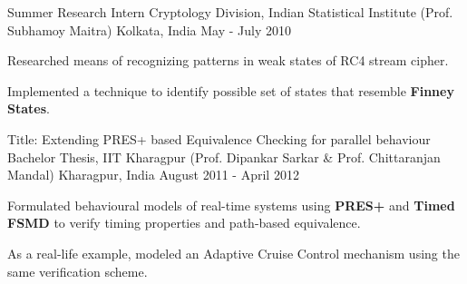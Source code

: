 

\begin{cventries}
    
  \cventry
    {Summer Research Intern} %
    {Cryptology Division, Indian Statistical Institute (Prof. Subhamoy Maitra)} %
    {Kolkata, India} %
    {May - July 2010} %
    {
      \begin{cvitems} %
        \item {Researched means of recognizing patterns in weak states of RC4 stream cipher.}
        \item {Implemented a technique to identify possible set of states that resemble \textbf{Finney States}.}
      \end{cvitems} 
    }

  \cventry
    {Title: Extending PRES+ based Equivalence Checking for parallel behaviour} %
    {Bachelor Thesis, IIT Kharagpur (Prof. Dipankar Sarkar \& Prof. Chittaranjan Mandal)} %
    {Kharagpur, India} %
    {August 2011 - April 2012} %
    {
      \begin{cvitems} %
        \item {Formulated behavioural models of real-time systems using \textbf{PRES+} and \textbf{Timed FSMD} to verify timing properties and path-based equivalence.}
        \item {As a real-life example, modeled an Adaptive Cruise Control mechanism using the same verification scheme.}
      \end{cvitems}
    }


\end{cventries}
